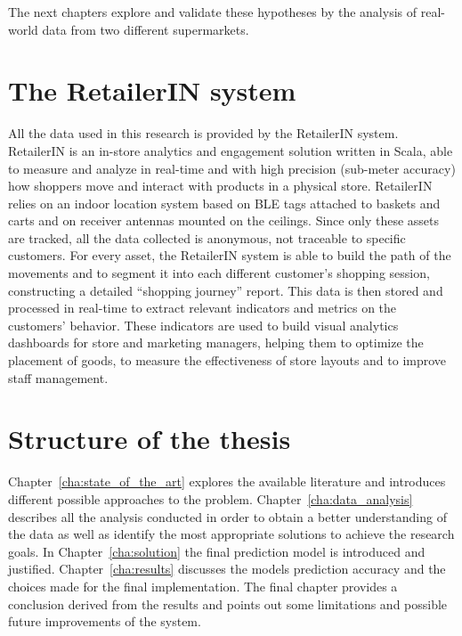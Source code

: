 The next chapters explore and validate these hypotheses by the analysis of real-world data from two different supermarkets.

\section{The RetailerIN system}
\label{sec:retailerin_system}

All the data used in this research is provided by the RetailerIN system. RetailerIN is an in-store analytics and engagement solution written in Scala, able to measure and analyze in real-time and with high precision (sub-meter accuracy) how shoppers move and interact with products in a physical store. RetailerIN relies on an indoor location system based on BLE tags attached to baskets and carts and on receiver antennas mounted on the ceilings. Since only these assets are tracked, all the data collected is anonymous, not traceable to specific customers. For every asset, the RetailerIN system is able to build the path of the movements and to segment it into each different customer’s shopping session, constructing a detailed “shopping journey” report. This data is then stored and processed in real-time to extract relevant indicators and metrics on the customers’ behavior. These indicators are used to build visual analytics dashboards for store and marketing managers, helping them to optimize the placement of goods, to measure the effectiveness of store layouts and to improve staff management.

\section{Structure of the thesis}
\label{sec:structure_of_the_thesis}

Chapter~\ref{cha:state_of_the_art} explores the available literature and introduces different possible approaches to the problem. Chapter~\ref{cha:data_analysis} describes all the analysis conducted in order to obtain a better understanding of the data as well as identify the most appropriate solutions to achieve the research goals. In Chapter~\ref{cha:solution} the final prediction model is introduced and justified. Chapter~\ref{cha:results} discusses the models prediction accuracy and the choices made for the final implementation. The final chapter provides a conclusion derived from the results and points out some limitations and possible future improvements of the system.

\medskip
\clearpage